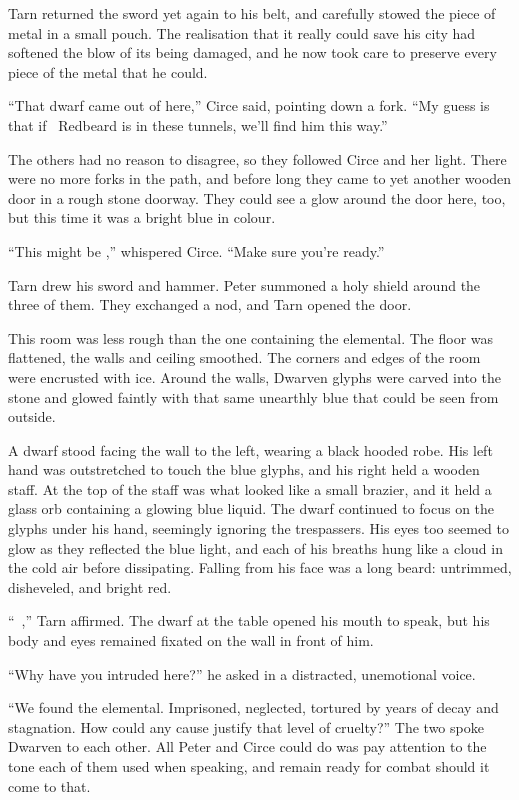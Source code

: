 Tarn returned the sword yet again to his belt, and carefully stowed the piece of metal in a small pouch.  The realisation that it really could save his city had softened the blow of its being damaged, and he now took care to preserve every piece of the metal that he could.

``That dwarf came out of here,'' Circe said, pointing down a fork.  ``My guess is that if \mothzam\ Redbeard is in these tunnels, we'll find him this way.''

The others had no reason to disagree, so they followed Circe and her light.  There were no more forks in the path, and before long they came to yet another wooden door in a rough stone doorway.  They could see a glow around the door here, too, but this time it was a bright blue in colour.

``This might be \mothzam,'' whispered Circe.  ``Make sure you're ready.''

Tarn drew his sword and hammer.  Peter summoned a holy shield around the three of them.  They exchanged a nod, and Tarn opened the door.

This room was less rough than the one containing the elemental.  The floor was flattened, the walls and ceiling smoothed.  The corners and edges of the room were encrusted with ice.  Around the walls, Dwarven glyphs were carved into the stone and glowed faintly with that same unearthly blue that could be seen from outside.

A dwarf stood facing the wall to the left, wearing a black hooded robe.  His left hand was outstretched to touch the blue glyphs, and his right held a wooden staff.  At the top of the staff was what looked like a small brazier, and it held a glass orb containing a glowing blue liquid.  The dwarf continued to focus on the glyphs under his hand, seemingly ignoring the trespassers.  His eyes too seemed to glow as they reflected the blue light, and each of his breaths hung like a cloud in the cold air before dissipating.  Falling from his face was a long beard: untrimmed, disheveled, and bright red.

``\mothzam\ \driktur,'' Tarn affirmed.  The dwarf at the table opened his mouth to speak, but his body and eyes remained fixated on the wall in front of him.

``Why have you intruded here?'' he asked in a distracted, unemotional voice.

``We found the elemental.  Imprisoned, neglected, tortured by years of decay and stagnation.  How could any cause justify that level of cruelty?''  The two spoke Dwarven to each other.  All Peter and Circe could do was pay attention to the tone each of them used when speaking, and remain ready for combat should it come to that.

